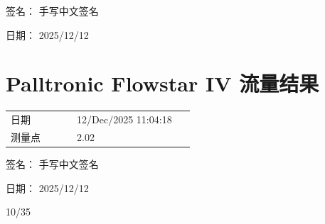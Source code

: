 \documentclass[UTF8,10pt,a4paper,fontset=fandol]{ctexart}
\newcommand{\fieldvalue}[1]{#1}
\newcommand{\handwritten}[1]{#1}
\begin{document}
\vspace{1em}

签名：%
\fieldvalue{\handwritten{手写中文签名}}

日期：%
\fieldvalue{\handwritten{2025/12/12}}

\section{Palltronic Flowstar IV 流量结果}

\begin{tabular}{@{}p{0.32\linewidth}p{0.58\linewidth}@{}}
日期 &
\fieldvalue{12/Dec/2025 11:04:18}
\\[2pt]
测量点 &
\fieldvalue{2.02}
\end{tabular}

\vspace{1em}

\begin{center}
\setlength{\fboxsep}{8pt}
\end{center}

\vspace{1em}

签名：%
\fieldvalue{\handwritten{手写中文签名}}

日期：%
\fieldvalue{\handwritten{2025/12/12}}

\vspace{0.5em}

\fieldvalue{\handwritten{10/35}}

\newpage
\end{document}
